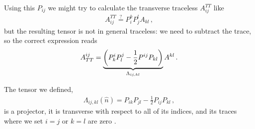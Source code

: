\documentclass[main.tex]{subfiles}
\begin{document}
Using this \(P_{ij}\) we might try to calculate the transverse traceless \(A_{ij}^{TT}\) like 
%
\begin{align}
A^{TT}_{ij} \overset{?}{=} P^{k}_{i} P^{l}_{j} A_{kl} 
\,,
\end{align}
%
but the resulting tensor is not in general traceless: we need to subtract the trace, so the correct expression reads
%
\begin{align}
A^{ij}_{TT} = \underbrace{\qty(P^{i}_{k} P^{j}_{l} - \frac{1}{2} P^{ij} P_{kl})}_{\Lambda_{ij, kl}} A^{kl}
\,.
\end{align}

The tensor we defined, 
%
\begin{align} \label{eq:lambda-projection-tensor}
\Lambda_{ij, kl} (\hat{n}) = P_{ik} P_{jl} - \frac{1}{2} P_{ij} P_{kl}
\,,
\end{align}
%
is a projector, it is transverse with respect to all of its indices, and its traces where we set \(i = j\) or \(k = l\) are zero \cite[eqs.\ 
1.36 to 1.39]{maggioreGravitationalWavesVolume2007}.
\end{document}
